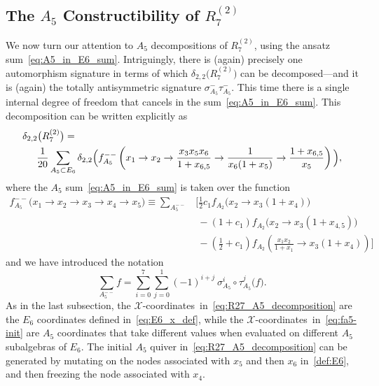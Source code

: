 \documentclass[12pt]{article}
\def\xcoords{$\mathcal{X}$-coordinates}
\def\pdfeq#1{\texorpdfstring{$#1$}{a}}
\begin{document}
\subsection{The \pdfeq{A_5} Constructibility of \pdfeq{R^{(2)}_7}}\label{sec:a5-func}

We now turn our attention to $A_5$ decompositions of $R^{(2)}_7$, using the ansatz sum~\eqref{eq:A5_in_E6_sum}. Intriguingly, there is (again) precisely one automorphism signature in terms of which $\delta_{2,2}\big(R^{(2)}_7\big)$ can be decomposed---and it is (again) the totally antisymmetric signature $\sigma_{A_5}^-\tau_{A_5}^-$. This time there is a single internal degree of freedom that cancels in the sum~\eqref{eq:A5_in_E6_sum}. This decomposition can be written explicitly as
\begin{align}
\delta_{2,2}\big(R^{(2)}_7 \big) &= \label{eq:R27_A5_decomposition}\\ 
&\hspace{-1cm}\frac{1}{20} \sum_{A_5\subset E_6} \delta_{2,2} \Big(f_{A_5}^{--} \left(x_1 \to x_2 \to \frac{x_3 x_5 x_6}{1+x_{6,5}} \to \frac{1}{x_6 (1+x_5)}  \to \frac{1+x_{6,5}}{x_5} \right) \Big), \nonumber 
\end{align}
where the $A_5$ sum~\eqref{eq:A5_in_E6_sum} is taken over the function
\begin{align}
	f_{A_5}^{--}\big( x_1\to x_2\to x_3 \to x_4  \to x_5 \big) \equiv \sum_{A_5^{--}} 
	& \bigg[ \frac{1}{2} c_1 f_{A_2}\big(x_2\to x_3 \left(1+x_4\right)\big)  \label{eq:fa5-init}  \\[-.4cm]
	&\ - \left(1+ c_1\right) f_{A_2}\big(x_2\to x_3 \left(1+x_{4,5}\right)\big)  \nonumber \\ 
	&\ - \left(\frac{1}{2} + c_1\right) f_{A_2}\left(\frac{x_1 x_2}{1+x_1}\to x_3 \left(1+x_4\right)\right) \bigg] \nonumber
\end{align}
and we have introduced the notation
\begin{equation}
\sum_{A_5^{--}} f = \sum_{i=0}^7 \sum_{j=0}^1 (-1)^{i+j} \ \sigma_{A_5}^i \circ \tau_{A_5}^j \big(f \big).
\end{equation}
As in the last subsection, the \xcoords\ in~\eqref{eq:R27_A5_decomposition} are the $E_6$ coordinates defined in~\eqref{eq:E6_x_def}, while the \xcoords\ in~\eqref{eq:fa5-init} are $A_5$ coordinates that take different values when evaluated on different $A_5$ subalgebras of $E_6$. The initial $A_5$ quiver in~\eqref{eq:R27_A5_decomposition} can be generated by mutating on the nodes associated with $x_5$ and then $x_6$ in~\eqref{def:E6}, and then freezing the node associated with $x_4$. 
\end{document}
